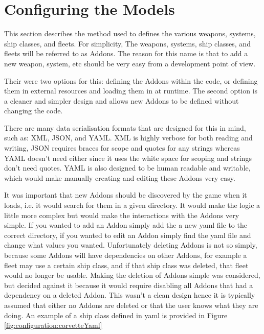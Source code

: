 \section{Configuring the Models}

% 

This section describes the method used to defines the various weapons, systems, ship classes, and fleets.
For simplicity, The weapons, systems, ship classes, and fleets will be referred to as Addons.
The reason for this name is that to add a new weapon, system, etc should be very easy from a development point of view.

Their were two options for this: defining the Addons within the code, or defining them in external resources and loading them in at runtime.
The second option is a cleaner and simpler design and allows new Addons to be defined without changing the code.

There are many data serialisation formats that are designed for this in mind, such as: XML, JSON, and YAML.
XML is highly verbose for both reading and writing, JSON requires braces for scope and quotes for any strings whereas YAML doesn't need either since it uses the white space for scoping and strings don't need quotes.
YAML is also designed to be human readable and writable, which would make manually creating and editing these Addons very easy.

It was important that new Addons should be discovered by the game when it loads, i.e. it would search for them in a given directory.
It would make the logic a little more complex but would make the interactions with the Addons very simple.
If you wanted to add an Addon simply add the a new yaml file to the correct directory, if you wanted to edit an Addon simply find the yaml file and change what values you wanted.
Unfortunately deleting Addons is not so simply, because some Addons will have dependencies on other Addons, for example a fleet may use a certain ship class, and if that ship class was deleted, that fleet would no longer be usable.
Making the deletion of Addons simple was considered, but decided against it because it would require disabling all Addons that had a dependency on a deleted Addon. This wasn't a clean design hence it is typically assumed that either no Addons are deleted or that the user knows what they are doing.
An example of a ship class defined in yaml is provided in Figure \ref{fig:configuration:corvetteYaml}


